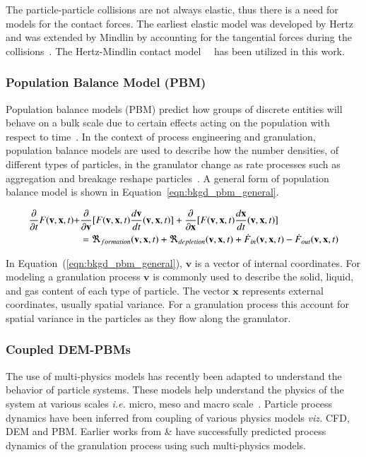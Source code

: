 \documentclass[preprint,11pt,authoryear]{elsarticle}
\begin{document}
The particle-particle collisions are not always elastic, thus there is a need for models for the 
contact forces. The earliest elastic model was developed by Hertz and was extended by Mindlin 
by accounting for the  tangential forces during the collisions~\citep{adams2000}. 
The Hertz-Mindlin contact model~\citep{gantt2006}~\citep{hassanpour2013} has been utilized 
in this work.
 

\subsubsection{Population Balance Model (PBM)}
     Population balance models (PBM) predict how groups of discrete entities will behave on a 
    bulk scale due to certain effects acting on the population with respect to time~\citep{ramkrishna2014}. In the context of process engineering and granulation, population 
    balance models are used to describe how the number densities, of different types of particles, in 
    the granulator change as rate processes such as aggregation and breakage reshape particles~\citep{Barrasso2013}. A general form of population balance model is shown in Equation~\ref{eqn:bkgd_pbm_general}.
    
    \begin{align}
    \frac{ \partial}{\partial t}F(\textbf{v},\textbf{x},t) +& \frac{\partial}{\partial 
        \textbf{v}}[F(\textbf{v},\textbf{x},t)\frac{d\textbf{v}}{dt}(\textbf{v},\textbf{x},t)] + 
    \frac{\partial}{\partial \textbf{x}}[F(\textbf{v},\textbf{x},t)\frac{d\textbf{x}}{dt}(\textbf{v},\textbf{x},t)] 
    \notag\\
    &= 
    \Re_{formation}(\textbf{v},\textbf{x},t)+\Re_{depletion}(\textbf{v},\textbf{x},t)+\dot{F}_{in}(\textbf{v},
    \textbf{x},t)-\dot{F}_{out}(\textbf{v},\textbf{x},t)
    \label{eqn:bkgd_pbm_general} 
    \end{align}
    
In Equation~(\ref{eqn:bkgd_pbm_general}), $\textbf{v}$ is a vector of internal coordinates. For 
modeling a granulation process $\textbf{v}$ is commonly used to describe the solid, liquid, and gas 
content of each type of particle. The vector $\textbf{x}$ represents external coordinates, usually 
spatial variance. For a granulation process this  account for spatial variance in the particles as they 
flow along the granulator.

\subsubsection{Coupled DEM-PBMs}
The use of multi-physics models has recently been adapted to understand the behavior of 
particle systems. These models help understand the physics of the system at various scales 
\textit{i.e.} micro, meso and macro scale~\citep{sen2014}. Particle process dynamics have been 
inferred from coupling of various physics models \textit{viz.} CFD, 
DEM and PBM. Earlier works from \cite{sen2014} \& \cite{Barrasso2015cerd} have successfully 
predicted process dynamics of the granulation process using such multi-physics models.
\end{document}
